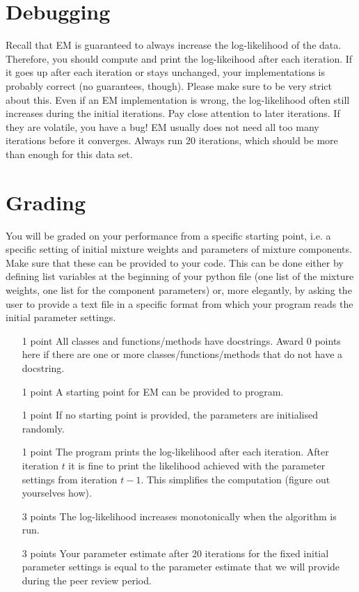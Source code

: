 \documentclass[11pt, leqno, a4paper]{article}
\begin{document}
\section{Debugging}

Recall that EM is guaranteed to always increase the log-likelihood of the data. Therefore, you should compute and print the log-likeihood after each iteration.
If it goes up after each iteration or stays unchanged, your implementations is probably correct (no guarantees, though). Please make sure to be very strict about
this. Even if an EM implementation is wrong, the log-likelihood often still increases during the initial iterations. Pay close attention to later iterations. If they
are volatile, you have a bug! EM usually does not need all too many iterations before it converges. Always run 20 iterations, which should be more than enough for 
this data set.

\section{Grading}

You will be graded on your performance from a specific starting point, i.e. a specific setting of initial mixture weights and parameters of mixture components.
Make sure that these can be provided to your code. This can be done either by defining list variables at the beginning of your python file (one list of the
mixture weights, one list for the component parameters) or, more elegantly, by asking the user to provide a text file in a specific format from which your program
reads the initial parameter settings.

\begin{itemize}
\item[1 point] All classes and functions/methods have docstrings. Award 0 points here if there are one or more classes/functions/methods that do not have a 
docstring.
\item[1 point] A starting point for EM can be provided to program.
\item[1 point] If no starting point is provided, the parameters are initialised randomly.
\item[1 point] The program prints the log-likelihood after each iteration. After iteration $ t $ it is fine to print the likelihood achieved with the parameter
settings from  iteration $ t-1 $. This simplifies the computation (figure out yourselves how).
\item[3 points] The log-likelihood increases monotonically when the algorithm is run.
\item[3 points] Your parameter estimate after 20 iterations for the fixed initial parameter settings is equal to the parameter estimate that we will provide during the 
peer review period.
\end{itemize}
\end{document}
